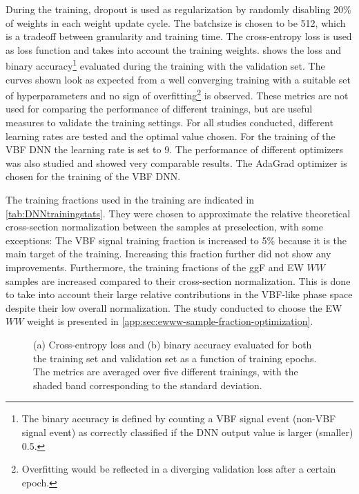 During the training, dropout is used as regularization by randomly disabling 20\% of weights in each weight update cycle.
The batchsize is chosen to be 512, which is a tradeoff between granularity and training time.
The cross-entropy loss is used as loss function and takes into account the training weights.
 shows the loss and binary accuracy\footnote{The binary accuracy is defined by counting a VBF signal event (non-VBF signal event) as correctly classified if the DNN output value is larger (smaller) 0.5.
} evaluated during the training with the validation set.
The curves shown look as expected from a well converging training with a suitable set of hyperparameters and no sign of overfitting\footnote{Overfitting would be reflected in a diverging validation loss after a certain epoch.} is observed. These metrics are not used for comparing the performance of different trainings, but are useful measures to validate the training settings. For all studies conducted, different learning rates are tested and the optimal value chosen.
For the training of the VBF DNN the learning rate is set to 9.
The performance of different optimizers was also studied and showed very comparable results. The AdaGrad optimizer is chosen for the training of the VBF DNN.

The training fractions used in the training are indicated in \cref{tab:DNNtrainingstats}. They were chosen to approximate the relative theoretical cross-section normalization between the samples at preselection, with some exceptions: The VBF signal training fraction is increased to 5\% because it is the main target of the training. Increasing this fraction further did not show any improvements. Furthermore, the training fractions of the ggF and EW $WW$ samples are increased compared to their cross-section normalization. This is done to take into account their large relative contributions in the VBF-like phase space despite their low overall normalization. The study conducted to choose the EW $WW$ weight is presented in \cref{app:sec:ewww-sample-fraction-optimization}.

\begin{figure}[t]
    \caption{(a) Cross-entropy loss and (b) binary accuracy evaluated for both the training set and validation set as a function of training epochs. The metrics are averaged over five different trainings, with the shaded band corresponding to the standard deviation.}
    \label{fig:monitoring}
\end{figure}


